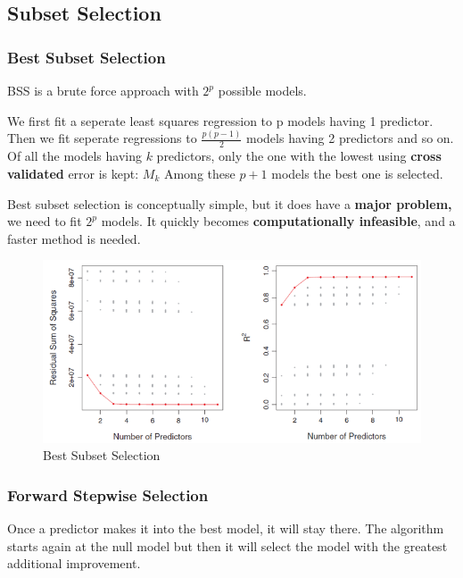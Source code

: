 \documentclass[../Main.tex]{subfiles}
\begin{document}
\subsection{Subset Selection}
\begin{multicols}{2}
    \subsubsection{Best Subset Selection}
    BSS is a brute force approach with \(2^p\) possible models.

    We first fit a seperate least squares regression to p models having 1 predictor.
    Then we fit seperate regressions to \(\frac{p(p-1)}{2}\) models having 2 predictors and so on.
    Of all the models having \(k\) predictors, only the one with the lowest 
    using \textbf{cross validated} error  is kept: \(M_k\)
    Among these \(p+1\) models the best one is selected.

    Best subset selection is conceptually 
    simple, but it does have a \textbf{major 
    problem, }we need to fit \(2^p\) models.
    It quickly becomes \textbf{computationally 
    infeasible}, and a faster method is needed.

    \begin{figure}[H]
        \centering
        \includegraphics[width=1\linewidth]{Images/best-subset-selection.png}
        \caption{Best Subset Selection}
    \end{figure}

    \subsubsection{Forward Stepwise Selection}
    Once a predictor makes it into the best model, it will stay there.
    The algorithm starts again at the null model but then it will select the model
    with the greatest additional improvement.
    

\end{multicols}
\end{document}
